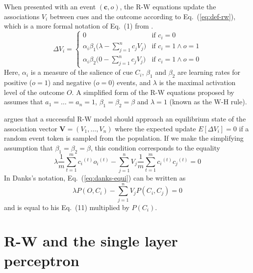 \documentclass[a4paper,11pt]{article} %
\newcommand{\psup}[1]{\ensuremath{^{(#1)}}}
\newcommand{\psupt}{\psup{t}}
\begin{document}
When presented with an event $(\mathbf{c}, o)$, the R-W equations update the associations $V_i$ between cues and the outcome according to Eq.~(\ref{eq:def-rw}), which is a more formal notation of Eq.~(1) from \citet[111]{Danks:03}.
\begin{equation}
  \label{eq:def-rw}
  \Delta V_i =
  \begin{cases}
    0 & \text{if } c_i = 0\\
    \alpha_i \beta_1 \bigl(\lambda - \sum_{j=1}^n c_j V_j \bigr) & \text{if } c_i = 1 \wedge o = 1 \\
    \alpha_i \beta_2 \bigl(0 - \sum_{j=1}^n c_j V_j \bigr) & \text{if } c_i = 1 \wedge o = 0
  \end{cases}
\end{equation}
Here, $\alpha_i$ is a measure of the salience of cue $C_i$, $\beta_1$ and $\beta_2$ are learning rates for positive ($o=1$) and negative ($o=0$) events, and $\lambda$ is the maximal activation level of the outcome $O$.  A simplified form of the R-W equations proposed by \citep{Widrow:Hoff:60} assumes that $a_1 = \dots = a_n = 1$,  $\beta_1 = \beta_2 = \beta$ and $\lambda = 1$ (known as the W-H rule).

\citet{Danks:03} argues that a successful R-W model should approach an equilibrium state of the association vector $\mathbf{V} = (V_1, \ldots, V_n)$ where the expected update $E[\Delta V_i] = 0$ if a random event token is sampled from the population.  If we make the simplifying assumption that $\beta_1 = \beta_2 = \beta$, this condition corresponds to the equality
\begin{equation}
  \label{eq:danks-equi}
  \lambda \frac1m \sum_{t=1}^m c_i\psupt o_i\psupt - \sum_{j=1}^n V_j \frac1m \sum_{t=1}^m c_i\psupt c_j\psupt = 0
\end{equation}
In Danks's notation, Eq.~(\ref{eq:danks-equi}) can be written as
\begin{equation}
  \label{eq:danks-probs}
  \lambda P(O, C_i) - \sum_{j=1}^n V_j P(C_i, C_j) = 0
\end{equation}
and is equal to his Eq.~(11) \citep[113]{Danks:03} multiplied by $P(C_i)$.

\section{R-W and the single layer perceptron}
\label{sec:slp}
\end{document}
